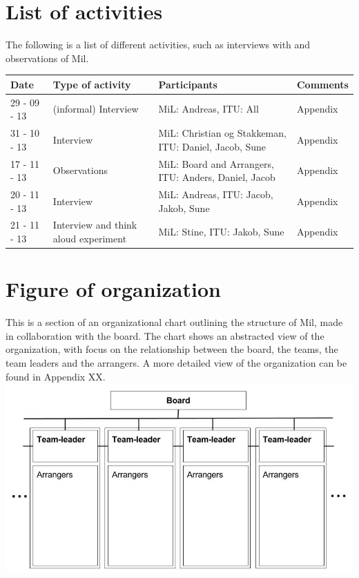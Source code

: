 \section{List of activities}
The following is a list of different activities, such as interviews with and observations of Mil.
\begin{center}
\begin{table}[H]
    \begin{tabular}{|p{3cm}|p{3cm}|p{3cm}|p{6cm}|}
    \hline
    \textbf{Date} & \textbf{Type of activity} & \textbf{Participants} & \textbf{Comments} \\ \hline
    29 - 09 - 13 & (informal) Interview & MiL: Andreas, ITU: All & Appendix  \\ \hline
    31 - 10 - 13 & Interview & MiL: Christian og Stakkeman, ITU: Daniel, Jacob, Sune &  Appendix  \\ \hline
    17 - 11 - 13 & Observations & MiL: Board and Arrangers, ITU: Anders, Daniel, Jacob & Appendix \\ \hline
    20 - 11 - 13 & Interview & MiL: Andreas, ITU: Jacob, Jakob, Sune & Appendix \\ \hline
    21 - 11 - 13 & Interview and think aloud experiment & MiL: Stine, ITU: Jakob, Sune & Appendix \\ \hline
    \end{tabular}
\end{table}
\end{center}

\section{Figure of organization}
\label{sec:organisation}
This is a section of an organizational chart outlining the structure of Mil, made in collaboration with the board. The chart shows an abstracted view of the organization, with focus on the relationship between the board, the teams, the team leaders and the arrangers. A more detailed view of the organization can be found in Appendix XX.\\
\includegraphics[scale=0.5]{Pictures/MIL_Organisational_chart_Abstract.jpg}
